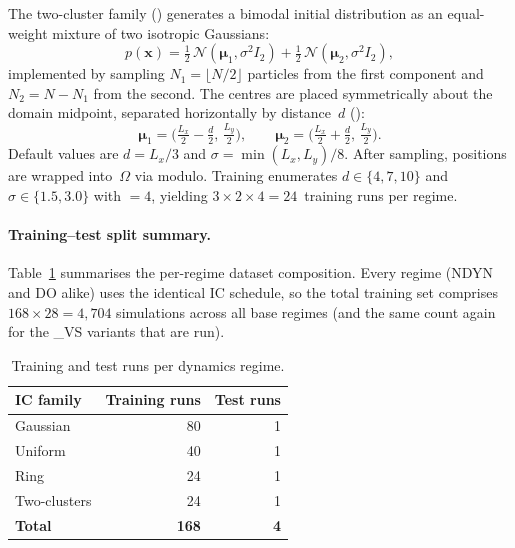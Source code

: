 \documentclass{report}
\theoremstyle{plain}
\theoremstyle{remark}
\numberwithin{equation}{section}              %
\begin{document}
The two-cluster family () generates a bimodal initial
distribution as an equal-weight mixture of two isotropic Gaussians:
\begin{equation}
  p(\mathbf{x})
  =\tfrac12\,\mathcal{N}(\boldsymbol{\mu}_1,\sigma^2 I_2)
  +\tfrac12\,\mathcal{N}(\boldsymbol{\mu}_2,\sigma^2 I_2),
  \label{eq:ic_two_clusters_mix}
\end{equation}
implemented by sampling $N_1=\lfloor N/2\rfloor$ particles from the first
component and $N_2=N-N_1$ from the second.  The centres are placed
symmetrically about the domain midpoint, separated horizontally by distance~$d$
():
\begin{equation}
  \boldsymbol{\mu}_1=\Big(\tfrac{L_x}{2}-\tfrac{d}{2},\,\tfrac{L_y}{2}\Big),
  \qquad
  \boldsymbol{\mu}_2=\Big(\tfrac{L_x}{2}+\tfrac{d}{2},\,\tfrac{L_y}{2}\Big).
  \label{eq:ic_two_clusters_centers}
\end{equation}
Default values are $d=L_x/3$ and $\sigma=\min(L_x,L_y)/8$.  After sampling,
positions are wrapped into~$\Omega$ via modulo.  Training enumerates
$d\in\{4,7,10\}$ and $\sigma\in\{1.5,3.0\}$ with
${}=4$, yielding $3\times 2\times 4=24$~training
runs per regime.

%
\paragraph{Training--test split summary.}
\label{subsec:train_test_split}

Table~\ref{tab:ic_split} summarises the per-regime dataset composition.  Every
regime (NDYN and DO alike) uses the identical IC schedule, so the total
training set comprises $168 \times 28 = 4{,}704$ simulations across all base
regimes (and the same count again for the \_VS variants that are run).

\begin{table}[H]
\centering
\caption{Training and test runs per dynamics regime.}
\label{tab:ic_split}
\begin{tabular}{lrr}
\hline
IC family & Training runs & Test runs \\
\hline
Gaussian     & 80 & 1 \\
Uniform      & 40 & 1 \\
Ring         & 24 & 1 \\
Two-clusters & 24 & 1 \\
\hline
\textbf{Total} & \textbf{168} & \textbf{4} \\
\hline
\end{tabular}
\end{table}
\end{document}
